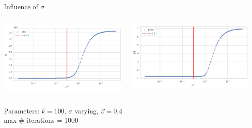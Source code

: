 \documentclass{beamer}
\begin{document}
\begin{frame}{Influence of $\sigma$}
	\begin{minipage}[0.95\textheight]{\textwidth}
	\begin{columns}[T]
	\begin{column}{0.50\textwidth}
	\includegraphics[width=\textwidth, keepaspectratio]{../images/D_sigma.png}
	\end{column}
	\begin{column}{0.50\textwidth}
	\includegraphics[width=\textwidth, keepaspectratio]{../images/v_sigma.png}
	\end{column}
	\end{columns}
	\end{minipage}
	\begin{center}
		Parameters: $k=100$, $\sigma$ varying, $\beta=0.4$\\
		max \# iterations = 1000
	\end{center}
\end{frame}
\end{document}
